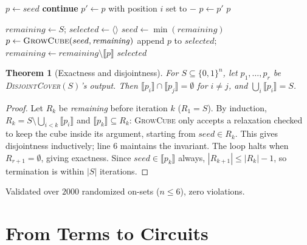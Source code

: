 \documentclass[conference]{IEEEtran}
\newcommand{\Algo}[1]{\textup{\textsc{#1}}}
\theoremstyle{plain}
\newtheorem{theorem}{Theorem}
\begin{document}
\begin{algorithm}[t]
\caption{\Algo{GrowCube}$(seed,\mathit{remaining})$}
\label{alg:grow}
\begin{algorithmic}[1]
\State $p \gets seed$
   \textbf{continue} \EndIf
  \State $p' \gets p$ with position $i$ set to ${-}$
   $p \gets p'$ \EndIf
\EndFor
\State \Return $p$
\end{algorithmic}
\end{algorithm}
\begin{algorithm}[t]
\caption{\Algo{DisjointCover}$(S)$}
\label{alg:cover}
\begin{algorithmic}[1]
\State $\mathit{remaining} \gets S$; $\mathit{selected} \gets \langle\rangle$
  \State $seed \gets \min(\mathit{remaining})$
  \State $p \gets \textsc{GrowCube}(seed,\mathit{remaining})$
  \State append $p$ to $\mathit{selected}$; $\mathit{remaining} \gets \mathit{remaining}\setminus\llbracket p\rrbracket$
\EndWhile
\State \Return $\mathit{selected}$
\end{algorithmic}
\end{algorithm}

\begin{theorem}[Exactness and disjointness]
\label{thm:exactness}
For $S\subseteq\{0,1\}^n$, let $p_1,\dots,p_r$ be \Algo{DisjointCover}$(S)$'s
output. Then $\llbracket p_i\rrbracket \cap \llbracket p_j\rrbracket=\emptyset$
for $i\ne j$, and $\bigcup_i \llbracket p_i\rrbracket = S$.
\end{theorem}
\begin{proof}
Let $R_k$ be \textit{remaining} before iteration $k$ ($R_1=S$). By
induction, $R_k=S\setminus\bigcup_{i<k}\llbracket p_i\rrbracket$ and
$\llbracket p_k\rrbracket\subseteq R_k$: \Algo{GrowCube} only accepts a
relaxation checked to keep the cube inside its argument, starting from
$seed\in R_k$. This gives disjointness inductively; line 6 maintains the
invariant. The loop halts when $R_{r+1}=\emptyset$, giving exactness.
Since $seed\in\llbracket p_k\rrbracket$ always, $|R_{k+1}|\le|R_k|-1$, so
termination is within $|S|$ iterations.
\end{proof}
Validated over $2000$ randomized on-sets ($n\le 6$), zero violations.

\section{From Terms to Circuits}
\label{sec:terms}
\end{document}
